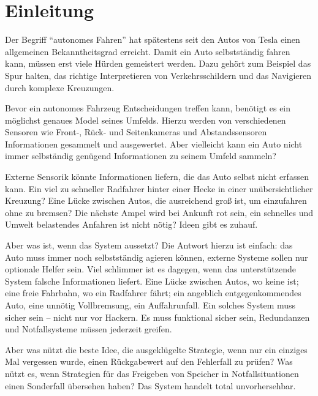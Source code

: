 
\chapter{Einleitung}

Der Begriff \enquote{autonomes Fahren} hat spätestens seit den Autos von Tesla einen allgemeinen Bekanntheitsgrad erreicht. Damit ein Auto selbstständig fahren kann, müssen erst viele Hürden gemeistert werden.
Dazu gehört zum Beispiel das Spur halten, das richtige Interpretieren von Verkehrsschildern und das Navigieren durch komplexe Kreuzungen.

Bevor ein autonomes Fahrzeug Entscheidungen treffen kann, benötigt es ein möglichst genaues Model seines Umfelds.
Hierzu werden von verschiedenen Sensoren wie Front-, Rück- und Seitenkameras und Abstandssensoren Informationen gesammelt und ausgewertet.
Aber vielleicht kann ein Auto nicht immer selbständig genügend Informationen zu seinem Umfeld sammeln? %

Externe Sensorik könnte Informationen liefern, die das Auto selbst nicht erfassen kann.
Ein viel zu schneller Radfahrer hinter einer Hecke in einer unübersichtlicher Kreuzung?
Eine Lücke zwischen Autos, die ausreichend groß ist, um einzufahren ohne zu bremsen?
Die nächste Ampel wird bei Ankunft rot sein, ein schnelles und Umwelt belastendes Anfahren ist nicht nötig?
Ideen gibt es zuhauf.

Aber was ist, wenn das System aussetzt?
Die Antwort hierzu ist einfach: das Auto muss immer noch selbstständig agieren können, externe Systeme sollen nur optionale Helfer sein.
Viel schlimmer ist es dagegen, wenn das unterstützende System falsche Informationen liefert.
Eine Lücke zwischen Autos, wo keine ist; eine freie Fahrbahn, wo ein Radfahrer fährt; ein angeblich entgegenkommendes Auto, eine unnötig Vollbremsung, ein Auffahrunfall.
Ein solches System muss sicher sein -- nicht nur vor Hackern.
Es muss funktional sicher sein, Redundanzen und Notfallsysteme müssen jederzeit greifen.

Aber was nützt die beste Idee, die ausgeklügelte Strategie, wenn nur ein einziges Mal vergessen wurde, einen Rückgabewert auf den Fehlerfall zu prüfen?
Was nützt es, wenn Strategien für das Freigeben von Speicher in Notfallsituationen einen Sonderfall übersehen haben?
Das System handelt total unvorhersehbar.

